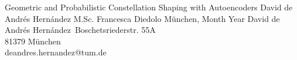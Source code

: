 \documentclass[chair=lnt]{ICEthesis} %
\begin{document}
    {Geometric and Probabilistic Constellation Shaping with Autoencoders}
    {David de Andrés Hernández}
    {M.Sc. Francesca Diedolo}
    {München, Month Year}
    { %
        David de Andrés Hernández\
        Boschetsriederstr. 55A\\
        81379 München\\
        deandres.hernandez@tum.de
    }


\cleardoubleemptypage %



\setcounter{page}{1}

\tableofcontents
\cleardoubleemptypage


\setcounter{page}{1}







\cleardoubleemptypage



%
%

\printglossary[
    type = acronym,
    title = List of Abbreviations,
    toctitle = List of Abbreviations,
    style = long,
    nonumberlist,
    numberedsection = false,
]

%
%
\printbibliography
\end{document}
